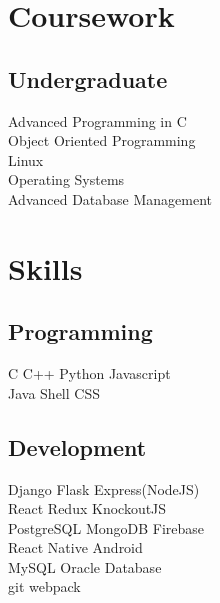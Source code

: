\documentclass[]{deedy-resume-openfont}
\begin{document}
\begin{minipage}[t]{0.33\textwidth}

\section{Coursework}

\subsection{Undergraduate}
Advanced Programming in C \\
Object Oriented Programming \\
Linux \\
Operating Systems \\
Advanced Database Management \\


\section{Skills}

\subsection{Programming}
C \textbullet{}   C++ \textbullet{} Python \textbullet{} Javascript \\ 
Java \textbullet{} Shell \textbullet{} CSS \\
\sectionsep

\subsection{Development}
Django \textbullet{} Flask \textbullet{} Express(NodeJS) \\
React \textbullet{} Redux \textbullet{} KnockoutJS \\ 
PostgreSQL \textbullet{} MongoDB \textbullet{} Firebase \\
React Native \textbullet{} Android \\
MySQL \textbullet{} Oracle Database \\
git \textbullet{} webpack \\
\sectionsep

%
%

\end{minipage} 
\end{document}
